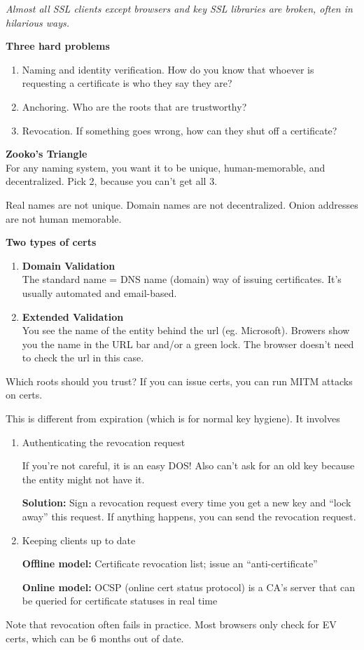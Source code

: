  \textit{Almost all SSL clients except browsers and key SSL libraries are broken, 
 often in hilarious ways.}

 \textbf{Three hard problems}
 \begin{enumerate}
    \item Naming and identity verification. How do you know that whoever is requesting
        a certificate is who they say they are?
    \item Anchoring. Who are the roots that are trustworthy?
    \item Revocation. If something goes wrong, how can they shut off a certificate?
\end{enumerate}

\textbf{Zooko's Triangle}\\
For any naming system, you want it to be unique, human-memorable, and decentralized. Pick 2, because you can't get all 3.
\begin{example}
Real names are not unique. Domain names are not decentralized. Onion addresses are not human memorable.
\end{example}

\textbf{Two types of certs}
\begin{enumerate}
    \item \textbf{Domain Validation}\\
        The standard name = DNS name (domain) way of issuing certificates. It's usually automated and email-based.
    \item \textbf{Extended Validation}\\
        You see the name of the entity behind the url (eg. Microsoft). Browers show you the name in the URL bar and/or a green lock. The browser doesn't need to check the url in this case.
\end{enumerate}

Which roots should you trust? If you can issue certs, you can run MITM attacks on certs.

This is different from expiration (which is for normal key hygiene). It involves
\begin{enumerate}
    \item Authenticating the revocation request

    If you're not careful, it is an easy DOS! Also can't ask for an old key because the entity might not have it. 

    \textbf{Solution:} Sign a revocation request every time you get a new key and ``lock away'' this request. If anything happens, you can send the revocation request.
    \item Keeping clients up to date

    \textbf{Offline model:} Certificate revocation list; issue an ``anti-certificate''

    \textbf{Online model:} OCSP (online cert status protocol) is a CA's server that can be queried for certificate statuses in real time
\end{enumerate}
Note that revocation often fails in practice. Most browsers only check for EV certs, which can be 6 months out of date.\\

